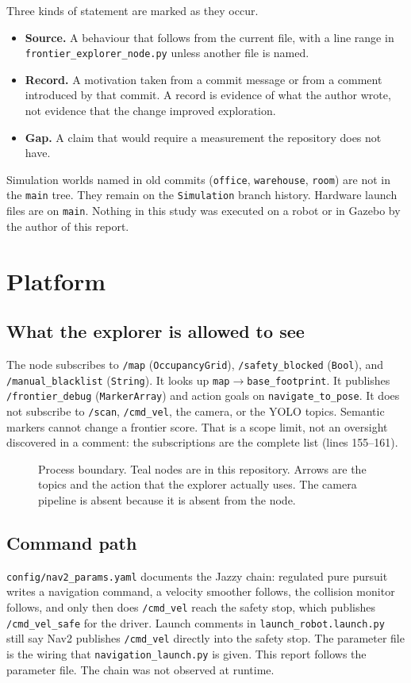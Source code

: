 \documentclass[11pt]{article}
\begin{document}
Three kinds of statement are marked as they occur.
\begin{itemize}
\item \textbf{Source.} A behaviour that follows from the current file, with a line range in \texttt{frontier\_explorer\_node.py} unless another file is named.
\item \textbf{Record.} A motivation taken from a commit message or from a comment introduced by that commit. A record is evidence of what the author wrote, not evidence that the change improved exploration.
\item \textbf{Gap.} A claim that would require a measurement the repository does not have.
\end{itemize}
Simulation worlds named in old commits (\texttt{office}, \texttt{warehouse}, \texttt{room}) are not in the \texttt{main} tree. They remain on the \texttt{Simulation} branch history. Hardware launch files are on \texttt{main}. Nothing in this study was executed on a robot or in Gazebo by the author of this report.

\section{Platform}
\subsection{What the explorer is allowed to see}
The node subscribes to \texttt{/map} (\texttt{OccupancyGrid}), \texttt{/safety\_blocked} (\texttt{Bool}), and \texttt{/manual\_blacklist} (\texttt{String}). It looks up \texttt{map}$\rightarrow$\texttt{base\_footprint}. It publishes \texttt{/frontier\_debug} (\texttt{MarkerArray}) and action goals on \texttt{navigate\_to\_pose}. It does not subscribe to \texttt{/scan}, \texttt{/cmd\_vel}, the camera, or the YOLO topics. Semantic markers cannot change a frontier score. That is a scope limit, not an oversight discovered in a comment: the subscriptions are the complete list (lines 155--161).

\begin{figure}[ht]
\centering
\FigArchitecture
\caption{Process boundary. Teal nodes are in this repository. Arrows are the topics and the action that the explorer actually uses. The camera pipeline is absent because it is absent from the node.}
\label{fig:arch}
\end{figure}

\subsection{Command path}
\texttt{config/nav2\_params.yaml} documents the Jazzy chain: regulated pure pursuit writes a navigation command, a velocity smoother follows, the collision monitor follows, and only then does \texttt{/cmd\_vel} reach the safety stop, which publishes \texttt{/cmd\_vel\_safe} for the driver. Launch comments in \texttt{launch\_robot.launch.py} still say Nav2 publishes \texttt{/cmd\_vel} directly into the safety stop. The parameter file is the wiring that \texttt{navigation\_launch.py} is given. This report follows the parameter file. The chain was not observed at runtime.
\end{document}
